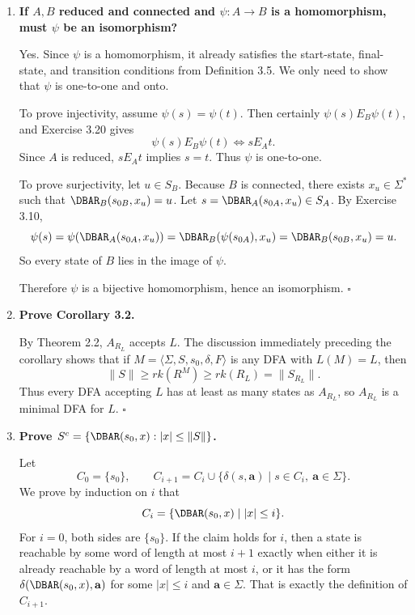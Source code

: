\begin{enumerate}[{3.}1.]
$E_{0A}$ has one class iff all states are equivalent under $E_{0A}$, i.e., all are final or all are nonfinal. Example: $F=S=\{q_0,q_1,q_2\}$ (all final). Then $E_{0A}=S\times S$ (one class). Can $E_{1A}\neq E_{0A}$? $E_{1A}$: $q E_{1A} r\Leftrightarrow q E_{0A} r\wedge(\forall a)\delta(q,a) E_{0A} \delta(r,a)$. Since $E_{0A}=S\times S$, all $\delta$-targets are in the same class, so $E_{1A}=E_{0A}$. So no, if $E_{0A}$ has one class then $E_{1A}=E_{0A}$.

\item \textbf{If $A,B$ reduced and connected and $\psi: A\to B$ is a homomorphism, must $\psi$ be an isomorphism?}

Yes. Since $\psi$ is a homomorphism, it already satisfies the start-state,
final-state, and transition conditions from Definition 3.5. We only need to show
that $\psi$ is one-to-one and onto.

To prove injectivity, assume $\psi(s)=\psi(t)$. Then certainly
$\psi(s) E_B \psi(t)$, and Exercise 3.20 gives
\[
\psi(s) E_B \psi(t)\Leftrightarrow s E_A t.
\]
Since $A$ is reduced, $s E_A t$ implies $s=t$. Thus $\psi$ is one-to-one.

To prove surjectivity, let $u\in S_B$. Because $B$ is connected, there exists
$x_u\in\Sigma^*$ such that $\DBAR_B(s_{0B},x_u)=u$. Let
$s=\DBAR_A(s_{0A},x_u)\in S_A$. By Exercise 3.10,
\[
\psi(s)=\psi(\DBAR_A(s_{0A},x_u))
=\DBAR_B(\psi(s_{0A}),x_u)
=\DBAR_B(s_{0B},x_u)
=u.
\]
So every state of $B$ lies in the image of $\psi$.

Therefore $\psi$ is a bijective homomorphism, hence an isomorphism. $\square$

\item \textbf{Prove Corollary 3.2.}

By Theorem 2.2, $A_{R_L}$ accepts $L$. The discussion immediately preceding the
corollary shows that if $M=\langle\Sigma,S,s_0,\delta,F\rangle$ is any DFA with
$L(M)=L$, then
\[
\|S\|\geq rk(R^M)\geq rk(R_L)=\|S_{R_L}\|.
\]
Thus every DFA accepting $L$ has at least as many states as $A_{R_L}$, so
$A_{R_L}$ is a minimal DFA for $L$. $\square$

\item \textbf{Prove $S^c=\{\DBAR(s_0,x):|x|\leq\|S\|\}$.}

Let
\[
C_0=\{s_0\},\qquad
C_{i+1}=C_i\cup\{\delta(s,\mathbf{a})\mid s\in C_i,\ \mathbf{a}\in\Sigma\}.
\]
We prove by induction on $i$ that
\[
C_i=\{\DBAR(s_0,x)\mid |x|\leq i\}.
\]
For $i=0$, both sides are $\{s_0\}$. If the claim holds for $i$, then a state is
reachable by some word of length at most $i+1$ exactly when either it is already
reachable by a word of length at most $i$, or it has the form
$\delta(\DBAR(s_0,x),\mathbf{a})$ for some $|x|\leq i$ and $\mathbf{a}\in\Sigma$.
That is exactly the definition of $C_{i+1}$.


\end{enumerate}
